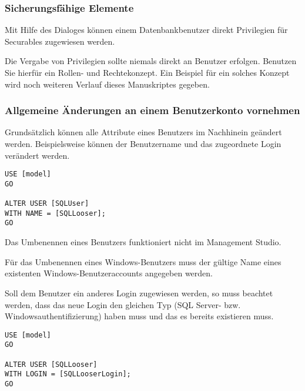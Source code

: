           \subsubsection{Sicherungsfähige Elemente}
            Mit Hilfe des Dialoges  können
            einem Datenbankbenutzer direkt Privilegien für Securables zugewiesen
            werden.
            \begin{merke}
              Die Vergabe von Privilegien sollte niemals direkt an Benutzer
              erfolgen. Benutzen Sie hierfür ein Rollen- und Rechtekonzept. Ein
              Beispiel für ein solches Konzept wird noch weiteren Verlauf dieses
              Manuskriptes gegeben.
            \end{merke}
            \begin{literaturinternet}
              \item \cite{aa337545}
            \end{literaturinternet}
          \subsubsection{Allgemeine Änderungen an einem Benutzerkonto vornehmen}
            Grundsätzlich können alle Attribute eines Benutzers im Nachhinein
            geändert werden. Beispielsweise können der
            Benutzername und das zugeordnete Login verändert werden.
            \begin{lstlisting}[language=ms_sql, caption={Umbenennen eines
            Benutzers}, label=admin19_08d]
USE [model]
GO

ALTER USER [SQLUser]
WITH NAME = [SQLLooser];
GO
            \end{lstlisting}
            \begin{merke}
              Das Umbenennen eines Benutzers funktioniert nicht im Management
              Studio.
              
              Für das Umbenennen eines Windows-Benutzers muss der gültige Name
              eines existenten Windows-Benutzeraccounts angegeben werden.
            \end{merke}            
            Soll dem Benutzer ein anderes Login zugewiesen werden, so muss
            beachtet werden, dass das neue Login den gleichen Typ (SQL Server-
            bzw. Windowsauthentifizierung) haben muss und das es bereits
            existieren muss.
            \begin{lstlisting}[language=ms_sql, caption={Umbenennen eines
            Benutzers}, label=admin19_08e]
USE [model]
GO

ALTER USER [SQLLooser]
WITH LOGIN = [SQLLooserLogin];
GO
            \end{lstlisting}
            \begin{literaturinternet}
              \item \cite{ms176060}
            \end{literaturinternet}
